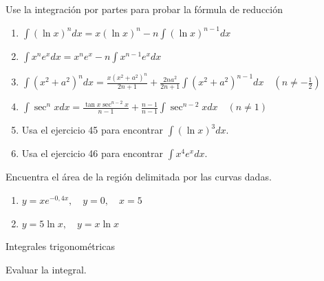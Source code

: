 \documentclass[12pt,]{article}
\begin{document}
Use la integración por partes para probar la fórmula de reducción

\begin{enumerate}
\def\labelenumi{\arabic{enumi}.}
\setcounter{enumi}{44}
\item
  \(\displaystyle\int(\ln x)^ndx=x(\ln x)^n-n\displaystyle\int(\ln x)^{n-1}dx\)
\item
  \(\displaystyle\int x^ne^xdx=x^ne^x-n\displaystyle\int x^{n-1}e^xdx\)
\item
  \(\displaystyle\int(x^2+a^2)^ndx =\frac{x(x^2+a^2)^n}{2n+1}+\frac{2na^2}{2n+1}\displaystyle\int(x^2+a^2)^{n-1}dx\quad (n\ne-\frac{1}{2})\)
\item
  \(\displaystyle\int\sec^nx dx=\frac{\tan x\sec^{n-2}x}{n-1}+\frac{n-1}{n-1}\displaystyle\int\sec^{n-2}xdx\quad (n\ne1)\)
\item
  Usa el ejercicio 45 para encontrar \(\displaystyle\int(\ln x)^3dx.\)
\item
  Usa el ejercicio 46 para encontrar \(\displaystyle\int x^4e^xdx.\)
\end{enumerate}

Encuentra el área de la región delimitada por las curvas dadas.

\begin{enumerate}
\def\labelenumi{\arabic{enumi}.}
\setcounter{enumi}{50}
\item
  \(y=xe^{-0,4x},\quad y=0,\quad x=5\)
\item
  \(y=5\ln x,\quad y=x\ln x\)
\end{enumerate}

\newpage

Integrales trigonométricas

Evaluar la integral.
\end{document}
